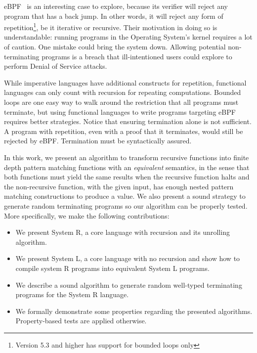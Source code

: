 \documentclass[runningheads]{llncs}
\begin{document}
eBPF~\cite{ebpf22} is an interesting case to explore, 
because its verifier will reject any program 
that has a back jump. In other words, it will 
reject any form of 
repetition\footnote{Version 5.3 and higher 
has support for 
bounded loops only}, be it iterative or 
recursive.
Their motivation in doing so is 
understandable: running programs in the 
Operating System's kernel requires a lot of 
caution. One mistake could bring the system
down.
Allowing potential non-terminating programs 
is a breach that ill-intentioned users could explore to 
perform Denial of Service attacks.

While imperative languages have additional 
constructs for repetition, functional 
languages can only 
count with recursion for repeating 
computations. Bounded loops are one easy way 
to walk around the restriction that all 
programs 
must terminate, but using functional 
languages 
to write programs targeting eBPF requires 
better strategies. Notice that ensuring termination 
alone is not 
sufficient. A program with repetition, even with a 
proof that it terminates, would still be rejected
by eBPF. Termination must be syntactically assured.

In this work, we present an algorithm to transform 
recursive functions into finite depth pattern 
matching functions with an {\it equivalent} 
semantics, in the sense that both functions must 
yield the same results when the recursive function 
halts and the non-recursive function, with the given input, has 
enough nested pattern matching constructions to produce a value. 
We also present a sound strategy to generate random terminating programs
so our algorithm can be properly tested.
More specifically, we make the following contributions:  

\begin{itemize}
\item We present System R, a core language with 
recursion and its unrolling algorithm.
\item We present System L, a core language with no 
recursion and show how to compile system R programs 
into equivalent System L programs.
\item We describe a sound algorithm to generate random 
well-typed terminating programs for the System R 
language.
\item We formally demonstrate some properties regarding 
the presented algorithms. Property-based tests are 
applied otherwise.
\end{itemize}

\newcommand{\stlc}{$\lambda_\rightarrow$}
\end{document}
